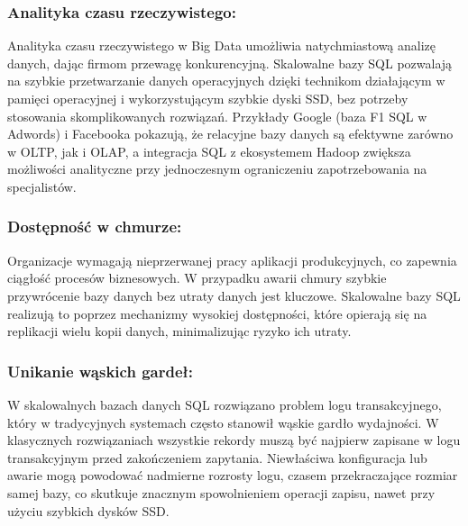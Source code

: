 \documentclass[letterpaper,10pt,polish]{sphinxmanual}
\begin{document}
\subsubsection{Analityka czasu rzeczywistego:}
\label{\detokenize{rozdzial2/Wydajnosc_Skalowanie_i_Replikacja/index:analityka-czasu-rzeczywistego}}
\sphinxAtStartPar
Analityka czasu rzeczywistego w Big Data umożliwia natychmiastową analizę danych, dając firmom przewagę konkurencyjną. Skalowalne bazy SQL pozwalają na szybkie przetwarzanie danych operacyjnych dzięki technikom działającym w pamięci operacyjnej i wykorzystującym szybkie dyski SSD, bez potrzeby stosowania skomplikowanych rozwiązań. Przykłady Google (baza F1 SQL w Adwords) i Facebooka pokazują, że relacyjne bazy danych są efektywne zarówno w OLTP, jak i OLAP, a integracja SQL z ekosystemem Hadoop zwiększa możliwości analityczne przy jednoczesnym ograniczeniu zapotrzebowania na specjalistów.


\subsubsection{Dostępność w chmurze:}
\label{\detokenize{rozdzial2/Wydajnosc_Skalowanie_i_Replikacja/index:dostepnosc-w-chmurze}}
\sphinxAtStartPar
Organizacje wymagają nieprzerwanej pracy aplikacji produkcyjnych, co zapewnia ciągłość procesów biznesowych. W przypadku awarii chmury szybkie przywrócenie bazy danych bez utraty danych jest kluczowe. Skalowalne bazy SQL realizują to poprzez mechanizmy wysokiej dostępności, które opierają się na replikacji wielu kopii danych, minimalizując ryzyko ich utraty.


\subsubsection{Unikanie wąskich gardeł:}
\label{\detokenize{rozdzial2/Wydajnosc_Skalowanie_i_Replikacja/index:unikanie-waskich-gardel}}
\sphinxAtStartPar
W skalowalnych bazach danych SQL rozwiązano problem logu transakcyjnego, który w tradycyjnych systemach często stanowił wąskie gardło wydajności. W klasycznych rozwiązaniach wszystkie rekordy muszą być najpierw zapisane w logu transakcyjnym przed zakończeniem zapytania. Niewłaściwa konfiguracja lub awarie mogą powodować nadmierne rozrosty logu, czasem przekraczające rozmiar samej bazy, co skutkuje znacznym spowolnieniem operacji zapisu, nawet przy użyciu szybkich dysków SSD.
\end{document}

